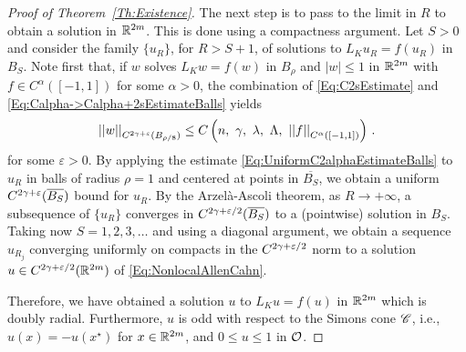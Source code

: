 \begin{proof}[Proof of Theorem~\ref{Th:Existence}]
The next step is to pass to the limit in $R$ to obtain a solution in $\mathbb{R}^{2m}$. This is done using a compactness argument. Let $S>0$ and consider the family $\{u_R\}$, for $R> S + 1$, of solutions to $L_K u_R = f(u_R)$ in $B_{S}$. Note first that, if $w$ solves $L_K w = f(w)$ in $B_\rho$ and  $|w|\leq 1$ in $\mathbb{R}^{2m}$ with $f\in C^{\alpha}([-1,1])$ for some $\alpha > 0$, the combination of \eqref{Eq:C2sEstimate} and \eqref{Eq:Calpha->Calpha+2sEstimateBalls} yields
\begin{equation}
\label{Eq:UniformC2alphaEstimateBalls}
\norm{w}_{C^{2\s + \varepsilon}(B_{\rho/8})} \leq C \bpar{n,\ \s ,\ \lambda,\ \Lambda ,\ \norm{f}_{C^{\alpha}([-1,1])} }\,.
\end{equation}
for some $\varepsilon > 0$.  By applying the estimate \eqref{Eq:UniformC2alphaEstimateBalls} to $u_R$ in balls of radius $\rho = 1$ and centered at points in $\overline{B_{S}}$, we obtain a uniform $C^{2\gamma + \varepsilon}(\overline{B_S})$ bound for $u_R$. By the Arzelà-Ascoli theorem, as $R\to +\infty$, a subsequence of $\{u_R\}$ converges in $C^{2\gamma + \varepsilon/2}(\overline{B_S})$ to a (pointwise) solution in $B_S$. Taking now $S = 1,2,3,\ldots$ and using a diagonal argument, we obtain a sequence $u_{R_j}$ converging uniformly on compacts in the $C^{2\gamma + \varepsilon/2}$ norm to a solution $u \in C^{2\gamma + \varepsilon/2}(\mathbb{R}^{2m})$ of \eqref{Eq:NonlocalAllenCahn}.

Therefore, we have obtained a solution $u$ to $L_K u = f(u)$ in $\mathbb{R}^{2m}$ which is doubly radial. Furthermore, $u$ is odd with respect to the Simons cone $\mathscr{C}$, i.e., $u(x) = -u(x^\star)$ for $x\in \mathbb{R}^{2m}$, and $0 \leq u\leq 1$ in $\mathcal{O}$.


\end{proof}
